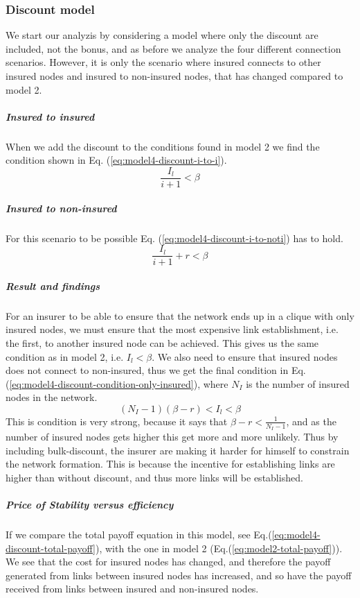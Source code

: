 \subsubsection{Discount model}
We start our analyzis by considering a model where only the discount are included, not the bonus, and as before we analyze the four different connection scenarios. However, it is only the scenario where insured connects to other insured nodes and insured to non-insured nodes, that has changed compared to model 2.
\subparagraph{Insured to insured}
When we add the discount to the conditions found in model 2 we find the condition shown in Eq. (\ref{eq:model4-discount-i-to-i}).
\begin{equation}
\frac{I_{l}}{i+1}<\beta
\label{eq:model4-discount-i-to-i}
\end{equation}
\subparagraph{Insured to non-insured}
For this scenario to be possible Eq. (\ref{eq:model4-discount-i-to-noti}) has to hold.
\begin{equation}
\frac{I_{l}}{i+1}+r<\beta
\label{eq:model4-discount-i-to-noti}
\end{equation}
\subparagraph{Result and findings}
For an insurer to be able to ensure that the network ends up in a clique with only insured nodes, we must ensure that the most expensive link establishment, i.e. the first, to another insured node can be achieved. This gives us the same condition as in model 2, i.e. $I_{l}<\beta$. 
We also need to ensure that insured nodes does not connect to non-insured, thus we get the final condition in Eq. (\ref{eq:model4-discount-condition-only-insured}), where $N_{I}$ is the number of insured nodes in the network.
\begin{equation}
(N_{I}-1)(\beta-r)<I_{l}<\beta
\label{eq:model4-discount-condition-only-insured}
\end{equation}
This is condition is very strong, because it says that $\beta-r<\frac{1}{N_{I}-1}$, and as the number of insured nodes gets higher this get more and more unlikely. 
Thus by including bulk-discount, the insurer are making it harder for himself to constrain the network formation. This is because the incentive for establishing links are higher than without discount, and thus more links will be established.
\subparagraph{Price of Stability versus efficiency}
If we compare the total payoff equation in this model, see Eq.(\ref{eq:model4-discount-total-payoff}), with the one in model 2 (Eq.(\ref{eq:model2-total-payoff})). We see that the cost for insured nodes has changed, and therefore the payoff generated from links between insured nodes has increased, and so have the payoff received from links between insured and non-insured nodes. 
